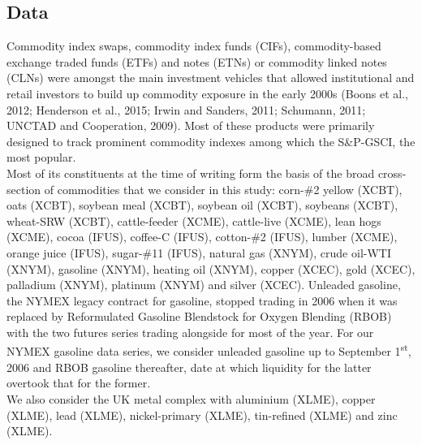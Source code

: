 \documentclass[]{elsarticle} %
\begin{document}
\hypertarget{co-movement-data}{%
\subsection{Data}\label{co-movement-data}}

Commodity index swaps, commodity index funds (CIFs), commodity-based exchange traded funds (ETFs) and notes (ETNs) or commodity linked notes (CLNs) were amongst the main investment vehicles that allowed institutional and retail investors to build up commodity exposure in the early 2000s (Boons et al., 2012; Henderson et al., 2015; Irwin and Sanders, 2011; Schumann, 2011; UNCTAD and Cooperation, 2009). Most of these products were primarily designed to track prominent commodity indexes among which the S\&P-GSCI, the most popular.\\
Most of its constituents at the time of writing form the basis of the broad cross-section of commodities that we consider in this study: corn-\#2 yellow (XCBT), oats (XCBT), soybean meal (XCBT), soybean oil (XCBT), soybeans (XCBT), wheat-SRW (XCBT), cattle-feeder (XCME), cattle-live (XCME), lean hogs (XCME), cocoa (IFUS), coffee-C (IFUS), cotton-\#2 (IFUS), lumber (XCME), orange juice (IFUS), sugar-\#11 (IFUS), natural gas (XNYM), crude oil-WTI (XNYM), gasoline (XNYM), heating oil (XNYM), copper (XCEC), gold (XCEC), palladium (XNYM), platinum (XNYM) and silver (XCEC). Unleaded gasoline, the NYMEX legacy contract for gasoline, stopped trading in 2006 when it was replaced by Reformulated Gasoline Blendstock for Oxygen Blending (RBOB) with the two futures series trading alongside for most of the year. For our NYMEX gasoline data series, we consider unleaded gasoline up to September 1\textsuperscript{st}, 2006 and RBOB gasoline thereafter, date at which liquidity for the latter overtook that for the former.\\
We also consider the UK metal complex with aluminium (XLME), copper (XLME), lead (XLME), nickel-primary (XLME), tin-refined (XLME) and zinc (XLME).

\medskip\setlength{\parindent}{0pt}
\end{document}
